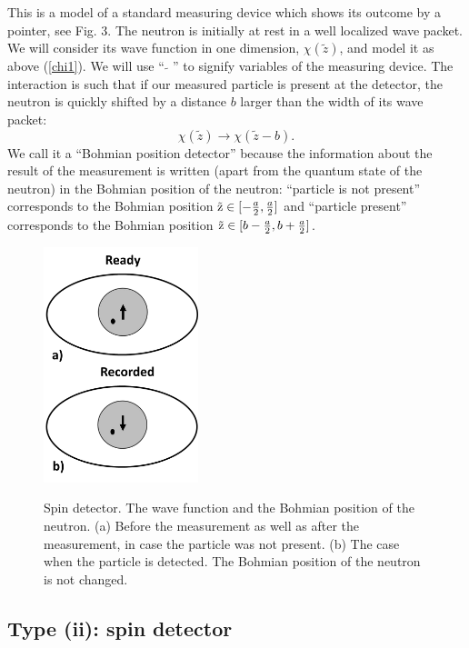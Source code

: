 \documentclass[12pt,preprint,tightenlines]{elsarticle}
\begin{document}
 This is a model of a standard
measuring device which shows its outcome by a pointer, see Fig. 3. The neutron
is initially at rest in a well localized wave packet. We will consider  its wave function in one dimension, $\chi(\tilde{z})$, and model it  as above (\ref{chi1}). We will use ``$~\tilde{~}~$'' to
signify variables of the measuring device. The interaction is such
that if our measured particle is present at the detector, the neutron
is quickly shifted by a distance $b$ larger than the width of its
wave packet:
\begin{equation}
\chi(\tilde{z})\rightarrow \chi(\tilde{z}-b).\label{psiout2}
\end{equation}
 We call it a ``Bohmian position detector'' because the information
about the result of the measurement is written (apart from the quantum
state of the neutron) in the Bohmian position of the neutron: ``particle
is not present'' corresponds to the Bohmian position ${\rm \tilde{z}}\in[-\frac{a}{2},\frac{a}{2}]$
and ``particle present'' corresponds to the Bohmian position ${\rm \tilde{z}}\in[b-\frac{a}{2},b+\frac{a}{2}]$.



\begin{figure}[h]
  \includegraphics[width=4.5cm]{4.pdf}\\ \vspace{-6pt}
    \caption{ Spin detector.  The wave function and the Bohmian position of the neutron. (a)  Before the measurement as well as after the measurement, in case the particle was not present. (b) The case when the particle is detected.  The Bohmian position of the neutron is not changed.}
\end{figure}

\subsection{  Type {\rm (ii)}: spin detector}
\end{document}
